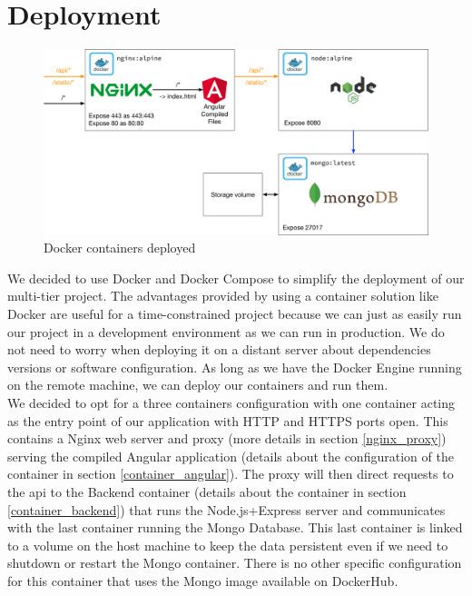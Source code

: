 \documentclass[twoside, openright,11pt,a4paper]{book}
\begin{document}
\section{Deployment}
\begin{figure}[H]
\begin{center}
	\includegraphics[width=\textwidth]{assets/deployment}
	\caption{Docker containers deployed}
	\label{docker_figu}
\end{center}
\end{figure}
We decided to use Docker and Docker Compose to simplify the deployment of our multi-tier project. The advantages provided by using a container solution like Docker are useful for a time-constrained project because we can just as easily run our project in a development environment as we can run in production. We do not need to worry when deploying it on a distant server about dependencies versions or software configuration. As long as we have the Docker Engine running on the remote machine, we can deploy our containers and run them. \\

We decided to opt for a three containers configuration with one container acting as the entry point of our application with HTTP and HTTPS ports open. This contains a Nginx web server and proxy (more details in section \ref{nginx_proxy}) serving the compiled Angular application (details about the configuration of the container in section \ref{container_angular}). The proxy will then direct requests to the \gls{api} to the Backend container (details about the container in section \ref{container_backend}) that runs the Node.js+Express server and communicates with the last container running the Mongo Database. This last container is linked to a volume on the host machine to keep the data persistent even if we need to shutdown or restart the Mongo container. There is no other specific configuration for this container that uses the Mongo image available on DockerHub\cite{docker:hub:mongo}. \\
\end{document}
